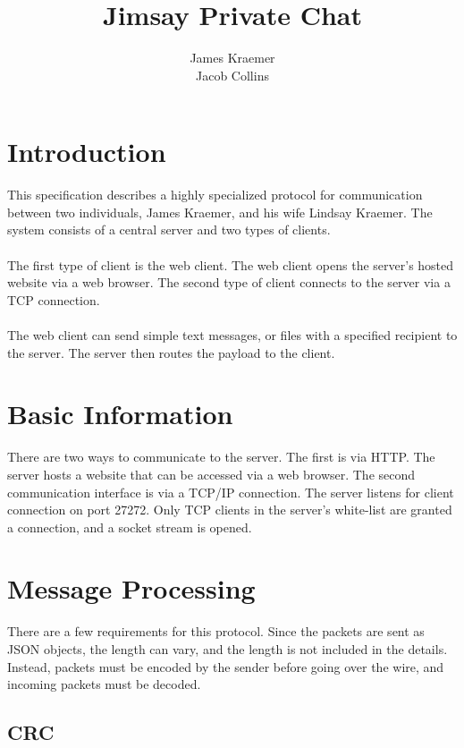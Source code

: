 \documentclass[a4paper, 10pt]{article}
\title{Jimsay Private Chat}
\author{James Kraemer\\ Jacob Collins}
\date{}
\begin{document}
\begin{titlepage}
\maketitle
\tableofcontents
\end{titlepage}


\section{Introduction}
This specification describes a highly specialized protocol for communication between two individuals, James Kraemer, and his wife Lindsay Kraemer. The system consists of a central server and two types of clients.
\\\\
The first type of client is the web client. The web client opens the server's hosted website via a web browser. The second type of client connects to the server via a TCP connection.
\\\\
The web client can send simple text messages, or files with a specified recipient to the server. The server then routes the payload to the client.

\section{Basic Information}
There are two ways to communicate to the server. The first is via HTTP. The server hosts a website that can be accessed via a web browser. The second communication interface is via a TCP/IP connection. The server listens for client connection on port 27272. Only TCP clients in the server's white-list are granted a connection, and a socket stream is opened.

\section{Message Processing}
There are a few requirements for this protocol. Since the packets are sent as JSON objects, the length can vary, and the length is not included in the details. Instead, packets must be encoded by the sender before going over the wire, and incoming packets must be decoded.

	\subsection{CRC}
\end{document}
